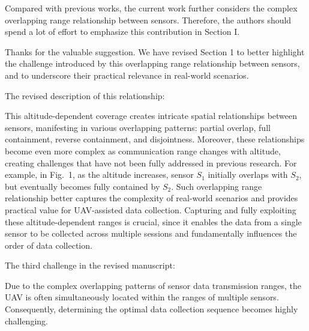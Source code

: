 \reviewer

\begin{revcomment}
	Compared with previous works, the current work further considers the complex overlapping range relationship between sensors. Therefore, the authors should spend a lot of effort to emphasize this contribution in Section I.
\end{revcomment}
\begin{revresponse}
	Thanks for the valuable suggestion.
	We have revised Section 1 to better highlight the challenge introduced by this overlapping range relationship between sensors, and to underscore their practical relevance in real-world scenarios.

	The revised description of this relationship:
	\begin{changes}
		This altitude-dependent coverage creates intricate spatial relationships between sensors, manifesting in various overlapping patterns: partial overlap, full containment, reverse containment, and disjointness.
		Moreover, these relationships become even more complex as communication range changes with altitude, creating challenges that have not been fully addressed in previous research.
		For example, in Fig.~1, as the altitude increases, sensor $S_1$ initially overlaps with $S_2$, but eventually becomes fully contained by $S_2$.
		Such overlapping range relationship better captures the complexity of real-world scenarios and provides practical value for UAV-assisted data collection.
		Capturing and fully exploiting these altitude-dependent ranges is crucial, since it enables the data from a single sensor to be collected across multiple sessions and fundamentally influences the order of data collection.
	\end{changes}
	The third challenge in the revised manuscript:
	\begin{changes}
		Due to the complex overlapping patterns of sensor data transmission ranges, the UAV is often simultaneously located within the ranges of multiple sensors. Consequently, determining the optimal data collection sequence becomes highly challenging.
	\end{changes}
\end{revresponse}

